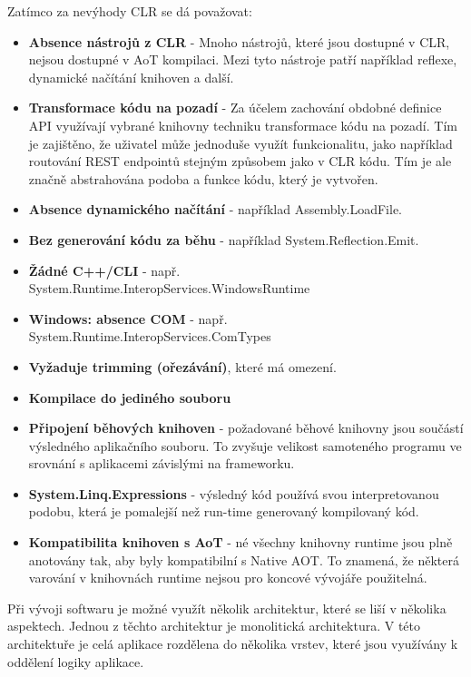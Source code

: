 
Zatímco za nevýhody CLR se dá považovat:
\begin{itemize}
    \item  \textbf{Absence nástrojů z CLR} - Mnoho nástrojů, které jsou dostupné v CLR, nejsou dostupné v AoT kompilaci. Mezi tyto nástroje patří například reflexe, dynamické načítání knihoven a další.
    \item \textbf{Transformace kódu na pozadí} - Za účelem zachování obdobné definice API využívají vybrané knihovny techniku transformace kódu na pozadí. Tím je zajištěno, že uživatel může jednoduše využít funkcionalitu, jako například routování REST endpointů stejným způsobem jako v CLR kódu. Tím je ale značně abstrahována podoba a funkce kódu, který je vytvořen.
    \item \textbf{Absence dynamického načítání} - například Assembly.LoadFile.
    \item \textbf{Bez generování kódu za běhu} - například System.Reflection.Emit.
    \item \textbf{Žádné C++/CLI} - např. System.Runtime.InteropServices.WindowsRuntime
    \item \textbf{Windows: absence COM} - např. System.Runtime.InteropServices.ComTypes
    \item \textbf{Vyžaduje trimming (ořezávání)}, které má omezení. 
    \item \textbf{Kompilace do jediného souboru} 
    \item \textbf{Připojení běhových knihoven} - požadované běhové knihovny jsou součástí výsledného aplikačního souboru. To zvyšuje velikost samoteného programu ve srovnání s aplikacemi závislými na frameworku.
    \item \textbf{System.Linq.Expressions} - výsledný kód používá svou interpretovanou podobu, která je pomalejší než run-time generovaný kompilovaný kód.
    \item \textbf{Kompatibilita knihoven s AoT} - né všechny knihovny runtime jsou plně anotovány tak, aby byly kompatibilní s Native AOT. To znamená, že některá varování v knihovnách runtime nejsou pro koncové vývojáře použitelná.
\end{itemize}

Při vývoji softwaru je možné využít několik architektur, které se liší v několika aspektech. Jednou z těchto architektur je monolitická architektura. V této architektuře je celá aplikace rozdělena do několika vrstev, které jsou využívány k oddělení logiky aplikace. \cite{monolith}

